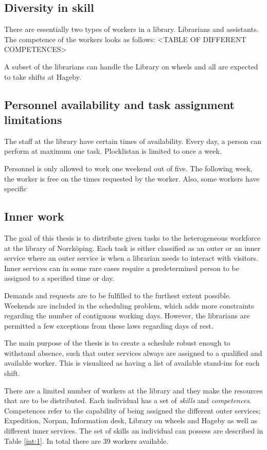 \subsection{Diversity in skill}
There are essentially two types of workers in a library. Librarians and assistants. The competence of the workers looks as follows: <TABLE OF DIFFERENT COMPETENCES>

A subset of the librarians can handle the Library on wheels and all are expected to take shifts at Hageby.

\subsection{Personnel availability and task assignment limitations}
The staff at the library have certain times of availability. Every day, a person can perform at maximum one task. Plocklistan is limited to once a week.

Personnel is only allowed to work one weekend out of five. The following week, the worker is free on the times requested by the worker. Also, some workers have specific 

\subsection{Inner work} 

The goal of this thesis is to distribute given tasks to the heterogeneous workforce at the library of Norrköping. Each task is either classified as an outer or an inner service where an outer service is when a librarian needs to interact with visitors. Inner services can in some rare cases require a predetermined person to be assigned to a specified time or day.

Demands and requests are to be fulfilled to the furthest extent possible. Weekends are included in the scheduling problem, which adds more constraints regarding the number of contiguous working days. However, the librarians are permitted a few exceptions from these laws regarding days of rest.

The main purpose of the thesis is to create a schedule robust enough to withstand absence, such that outer services always are assigned to a qualified and available worker. This is visualized as having a list of available stand-ins for each shift. 

There are a limited number of workers at the library and they make the resources that are to be distributed. Each individual has a set of \textit{skills} and \textit{competences}. Competences refer to the capability of being assigned the different outer services; Expedition, Norpan, Information desk, Library on wheels and Hageby as well as different inner services. The set of skills an individual can possess are described in Table \ref{int:1}. In total there are 39 workers available.

